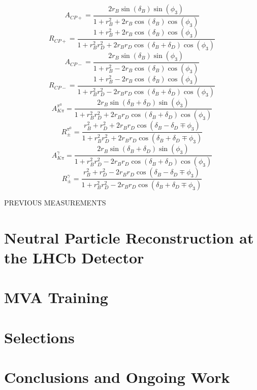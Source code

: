 \documentclass[oneside,12pt]{article}
\begin{document}
  \begin{equation}
		A_{CP+}=\frac{2r_{B}\sin(\delta_{B})\sin(\phi_{3})}{1+r_{B}^{2}+2r_{B}\cos(\delta_{B})\cos(\phi_{3})}
    \label{eq:ACPPlus}
  \end{equation}
  \begin{equation}
		R_{CP+}=\frac{1 + r_{B}^{2} + 2r_{B}\cos(\delta_{B})\cos(\phi_{3})}{1+r_{B}^{2}r_{D}^{2}+2r_{B}r_{D}\cos(\delta_{B}+\delta_{D})\cos(\phi_{3})}
    \label{eq:RCPPlus}
  \end{equation}
  \begin{equation}
		A_{CP-}=\frac{2r_{B}\sin(\delta_{B})\sin(\phi_{3})}{1+r_{B}^{2}-2r_{B}\cos(\delta_{B})\cos(\phi_{3})}
    \label{eq:ACPMinus}
  \end{equation}
  \begin{equation}
		R_{CP-}=\frac{1 + r_{B}^{2} - 2r_{B}\cos(\delta_{B})\cos(\phi_{3})}{1+r_{B}^{2}r_{D}^{2}-2r_{B}r_{D}\cos(\delta_{B}+\delta_{D})\cos(\phi_{3})}
    \label{eq:RCPMinus}
  \end{equation}
  \begin{equation}
		A_{K\pi}^{\pi^{0}}=\frac{2r_{B}\sin(\delta_{B}+\delta_{D})\sin(\phi_{3})}{1+r_{B}^{2}r_{D}^{2}+2r_{B}r_{D}\cos(\delta_{B}+\delta_{D})\cos(\phi_{3})}
    \label{eq:AfavPi0}
  \end{equation}
  \begin{equation}
		R_{\pm}^{\pi^{0}}=\frac{r_{B}^{2} + r_{D}^{2} + 2r_{B}r_{D}\cos(\delta_{B}-\delta_{D}\mp \phi_{3})}{1+r_{B}^{2}r_{D}^{2}+2r_{B}r_{D}\cos(\delta_{B}+\delta_{D}\mp \phi_{3})}
    \label{eq:RPlusMinusPi0}
  \end{equation}
  \begin{equation}
		A_{K\pi}^{\gamma}=\frac{2r_{B}\sin(\delta_{B}+\delta_{D})\sin(\phi_{3})}{1+r_{B}^{2}r_{D}^{2}-2r_{B}r_{D}\cos(\delta_{B}+\delta_{D})\cos(\phi_{3})}
    \label{eq:AfavGamma}
  \end{equation}
  \begin{equation}
		R_{\pm}^{\gamma}=\frac{r_{B}^{2} + r_{D}^{2} - 2r_{B}r_{D}\cos(\delta_{B}-\delta_{D}\mp \phi_{3})}{1+r_{B}^{2}r_{D}^{2}-2r_{B}r_{D}\cos(\delta_{B}+\delta_{D}\mp \phi_{3})}
    \label{eq:RPlusMinusGamma}
  \end{equation}


PREVIOUS MEASUREMENTS

\section{Neutral Particle Reconstruction at the LHCb Detector} \label{detector}
\section{MVA Training} \label{MVA}
\section{Selections} \label{selections}
\section{Conclusions and Ongoing Work} \label{conclusion}
\end{document}
